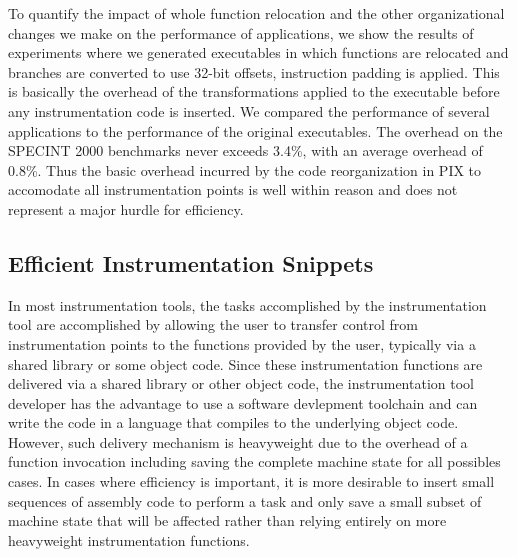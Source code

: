 To quantify the impact of whole function relocation and the other organizational changes we make
on the performance of applications, we show the results of experiments
where we generated executables in which functions are relocated and branches are converted to use 32-bit offsets, 
instruction padding is applied. This is basically the overhead of the transformations applied to the executable 
before any instrumentation code is inserted. We compared the performance of several applications to
the performance of the original executables. The overhead on the SPECINT 2000 benchmarks never exceeds 3.4\%, with an average
overhead of 0.8\%. Thus the basic overhead incurred by the code reorganization in PIX to accomodate all instrumentation points is
well within reason and does not represent a major hurdle for efficiency.

\subsection{Efficient Instrumentation Snippets}

In most instrumentation tools, the tasks accomplished by the instrumentation tool are accomplished by allowing the user
to transfer control from instrumentation points to the functions provided by the user, typically
via a shared library or some object code. Since these instrumentation functions are delivered via a shared library or other
object code, the instrumentation tool developer has the advantage to use a software devlepment toolchain and can
write the code in a language that compiles to the underlying object code. However, such delivery mechanism is heavyweight due to 
the overhead of a function invocation including saving the complete machine state for all possibles cases. In cases where
efficiency is important, it is more desirable to insert small sequences of assembly code to perform a task and only
save a small subset of machine state that will be affected rather than relying entirely on more heavyweight instrumentation functions.

